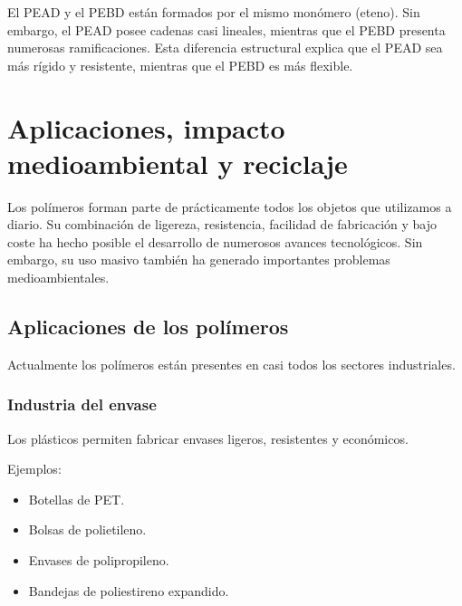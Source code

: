 
\begin{tcolorbox}[
title=Ejemplo,
colback=green!5,
colframe=green!60!black]

El PEAD y el PEBD están formados por el mismo monómero (eteno). Sin embargo,
el PEAD posee cadenas casi lineales, mientras que el PEBD presenta numerosas
ramificaciones. Esta diferencia estructural explica que el PEAD sea más rígido
y resistente, mientras que el PEBD es más flexible.

\end{tcolorbox}


\section{Aplicaciones, impacto medioambiental y reciclaje}

Los polímeros forman parte de prácticamente todos los objetos que utilizamos a diario.
Su combinación de ligereza, resistencia, facilidad de fabricación y bajo coste ha
hecho posible el desarrollo de numerosos avances tecnológicos. Sin embargo, su uso
masivo también ha generado importantes problemas medioambientales.


\subsection{Aplicaciones de los polímeros}

Actualmente los polímeros están presentes en casi todos los sectores industriales.

\subsubsection*{Industria del envase}

Los plásticos permiten fabricar envases ligeros, resistentes y económicos.

Ejemplos:

\begin{itemize}

\item Botellas de PET.

\item Bolsas de polietileno.

\item Envases de polipropileno.

\item Bandejas de poliestireno expandido.

\end{itemize}

